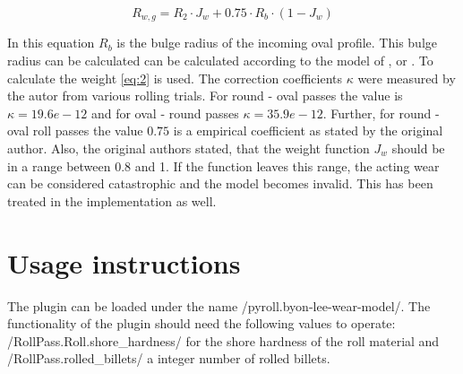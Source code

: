 \documentclass[11pt]{PyRollDocs}
\begin{document}
    \begin{equation}
        R_{w,g} = R_2 \cdot J_w + 0.75 \cdot R_{b} \cdot \left( 1 - J_w \right)
        \label{eq:3}
    \end{equation}

    In this equation $R_b$ is the bulge radius of the incoming oval profile.
    This bulge radius can be calculated can be calculated according to the model of \textcite{Schmidt2017}, \textcite{Byon2017} or \textcite{Lee2001a}.
    To calculate the weight \autoref{eq:2} is used.
    The correction coefficients $\kappa$ were measured by the autor from various rolling trials.
    For round - oval passes the value is $\kappa = 19.6e-12$ and for oval - round passes $\kappa =  35.9e-12$.
    Further, for round - oval roll passes the value $0.75$ is a empirical coefficient as stated by the original author.
    Also, the original authors stated, that the weight function $J_w$ should be in a range between 0.8 and 1.
    If the function leaves this range, the acting wear can be considered catastrophic and the model becomes invalid.
    This has been treated in the implementation as well.


    \section{Usage instructions}\label{sec:usage-instructions}

    The plugin can be loaded under the name \py/pyroll.byon-lee-wear-model/.
    The functionality of the plugin should need the following values to operate: \py/RollPass.Roll.shore_hardness/ for the shore hardness of the roll material and \py/RollPass.rolled_billets/ a integer number of rolled billets.



    \printbibliography
\end{document}
